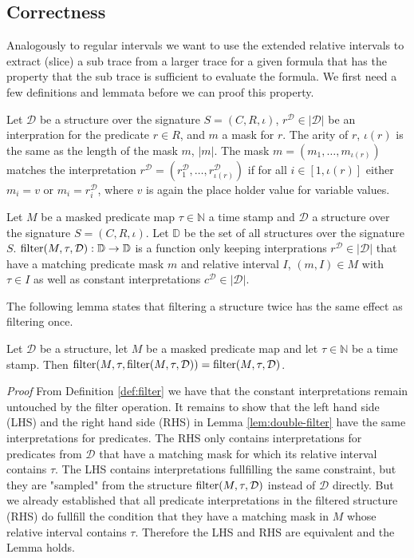\subsection{Correctness}
Analogously to regular intervals we want to use the extended relative intervals to extract (slice) a sub trace from a larger trace for a given formula that has the property that the sub trace is sufficient to evaluate the formula.
We first need a few definitions and lemmata before we can proof this property.
\begin{definition}
    \label{def:matching-predicate}
    Let $\mathcal{D}$ be a structure over the signature $S = (C,R,\iota)$, $r^{\mathcal{D}} \in |\mathcal{D}|$ be an interpration for the predicate $r \in R$, and $m$ a mask for $r$.
    The arity of $r$, $\iota(r)$ is the same as the length of the mask $m$, $|m|$.
    The mask $m = (m_1, \dots, m_{\iota(r)})$ matches the interpretation $r^{\mathcal{D}}= (r^{\mathcal{D}}_1, \dots, r^{\mathcal{D}}_{\iota(r)})$ if for all $i \in [1,\iota(r)]$ either $m_i = v$ or $m_i = r^{\mathcal{D}}_i$, where $v$ is again the place holder value for variable values.
\end{definition}
\begin{definition}
    \label{def:filter}
    Let $M$ be a masked predicate map $\tau \in \mathbb{N}$ a time stamp and $\mathcal{D}$ a structure over the signature $S = (C,R,\iota)$.
    Let $\mathbb{D}$ be the set of all structures over the signature $S$.
    $\operatorname{filter}(M, \tau,\mathcal{D}) : \mathbb{D} \to \mathbb{D}$ is a function only keeping interprations $r^{\mathcal{D}} \in |\mathcal{D}|$ that have a matching predicate mask $m$ and relative interval $I$, $(m,I) \in M$ with $\tau \in I$ as well as constant interpretations $c^{\mathcal{D}} \in |\mathcal{D}|$.
\end{definition}
The following lemma states that filtering a structure twice has the same effect as filtering once.
\begin{lemma}
    \label{lem:double-filter}
    Let $\mathcal{D}$ be a structure, let $M$ be a masked predicate map and let $\tau \in \mathbb{N}$ be a time stamp.
    Then $\operatorname{filter}(M, \tau ,\operatorname{filter}(M, \tau, \mathcal{D})) = \operatorname{filter}(M, \tau, \mathcal{D})$.
\end{lemma}
\textit{Proof} From Definition \ref{def:filter} we have that the constant interpretations remain untouched by the filter operation.
It remains to show that the left hand side (LHS) and the right hand side (RHS) in Lemma \ref{lem:double-filter} have the same interpretations for predicates.
The RHS only contains interpretations for predicates from $\mathcal{D}$ that have a matching mask for which its relative interval contains $\tau$.
The LHS contains interpretations fullfilling the same constraint, but they are "sampled" from the structure $\operatorname{filter}(M,\tau,\mathcal{D})$ instead of $\mathcal{D}$ directly.
But we already established that all predicate interpretations in the filtered structure (RHS) do fullfill the condition that they have a matching mask in $M$ whose relative interval contains $\tau$.
Therefore the LHS and RHS are equivalent and the Lemma holds.


